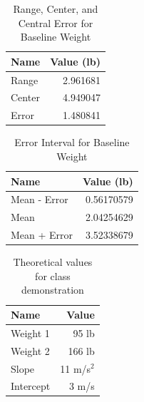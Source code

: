 \begin{table}
    \centering
	\begin{tabular}{|l|r|} \hline
		\textbf{Name} & \textbf{Value (lb)} \\
		\hline
		Range & 2.961681 \\
	    Center & 4.949047 \\
		Error & 1.480841 \\
		\hline
	\end{tabular}
    \caption{Range, Center, and Central Error for Baseline Weight}
    \label{table.00.baseline.range}
\end{table}
\begin{table}
    \centering
	\begin{tabular}{|l|r|} \hline
		\textbf{Name} & \textbf{Value (lb)} \\
		\hline
		Mean - Error & 0.56170579 \\
		Mean & 2.04254629 \\
		Mean + Error & 3.52338679 \\
		\hline
	\end{tabular}
    \caption{Error Interval for Baseline Weight}
    \label{table.00.baseline.interval}
\end{table}
\begin{table}
    \centering
    \begin{tabular}{|l|r|}
        \hline
        \textbf{Name} & \textbf{Value} \\
        \hline
        Weight 1 & 95 lb \\
        Weight 2 & 166 lb \\
        \hline
        Slope & 11 m/s$^{2}$ \\
        Intercept & 3 m/s \\
        \hline
    \end{tabular}
    \caption{Theoretical values for class demonstration}
    \label{table.00.theoretical.demo}
\end{table}
